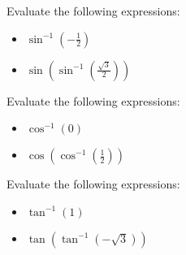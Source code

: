 \begin{exc}
  Evaluate the following expressions:

  \label{exc:evaluate_invs_sin}

  \begin{itemize}
    \label{item:evaluate_invs_sin}

    \item $\sin^{-1} (-\frac{1}{2})$
    \item $\sin (\sin^{-1} (\frac{\sqrt{3}}{2}))$
  \end{itemize}
\end{exc}

\begin{exc}
  Evaluate the following expressions:

  \label{exc:evaluate_invs_cos}

  \begin{itemize}
    \label{item:evaluate_invs_cos}

    \item $\cos^{-1} (0)$
    \item $\cos (\cos^{-1} (\frac{1}{2}))$
  \end{itemize}
\end{exc}

\begin{exc}
  Evaluate the following expressions:

  \label{exc:evaluate_invs_tan}

  \begin{itemize}
    \label{item:evaluate_invs_tan}

    \item $\tan^{-1} (1)$
    \item $\tan (\tan^{-1} (-\sqrt{3}))$
  \end{itemize}
\end{exc}

\newpage
